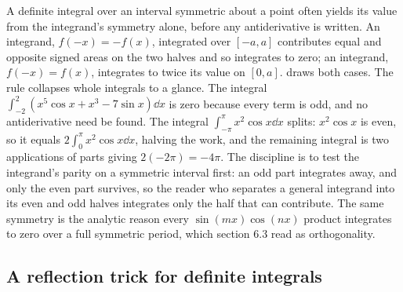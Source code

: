 A definite integral over an interval symmetric about a point often
yields its value from the integrand's symmetry alone, before any
antiderivative is written. An  integrand, $f(-x) = -f(x)$,
integrated over $[-a, a]$ contributes equal and opposite signed areas on
the two halves and so integrates to zero; an  integrand,
$f(-x) = f(x)$, integrates to twice its value on $[0, a]$.
 draws both cases. The rule
collapses whole integrals to a glance. The integral
$\int_{-2}^{2}(x^{5}\cos x + x^{3} - 7\sin x)\dd x$ is zero because every
term is odd, and no antiderivative need be found. The integral
$\int_{-\pi}^{\pi} x^{2}\cos x\dd x$ splits: $x^{2}\cos x$ is even, so it
equals $2\int_{0}^{\pi} x^{2}\cos x\dd x$, halving the work, and the
remaining integral is two applications of parts giving $2(-2\pi) =
-4\pi$. The discipline is to test the integrand's parity on a
symmetric interval first: an odd part integrates away, and only the even
part survives, so the reader who separates a general integrand into its
even and odd halves integrates only the half that can contribute. The
same symmetry is the analytic reason every $\sin(m x)\cos(n x)$ product
integrates to zero over a full symmetric period, which section 6.3 read
as orthogonality.



\subsection{A reflection trick for definite integrals}

